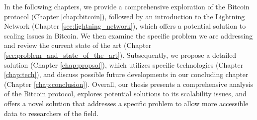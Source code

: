 In the following chapters, we provide a comprehensive exploration of the Bitcoin protocol
(Chapter \ref{chap:bitcoin}), followed by an introduction to the Lightning Network
(Chapter \ref{sec:lightning_network}), which offers a potential solution to scaling issues
in Bitcoin. We then examine the specific problem we are addressing and review the current
state of the art (Chapter \ref{sec:problem_and_state_of_the_art}). Subsequently, we propose
a detailed solution (Chapter \ref{chap:propsol}), which utilizes specific technologies
(Chapter \ref{chap:tech}), and discuss possible future developments in our concluding chapter
(Chapter \ref{chap:conclusion}). Overall, our thesis presents a comprehensive analysis of the
Bitcoin protocol, explores potential solutions to its scalability issues, and offers a novel
solution that addresses a specific problem to allow more accessible data to researchers of the
field.
